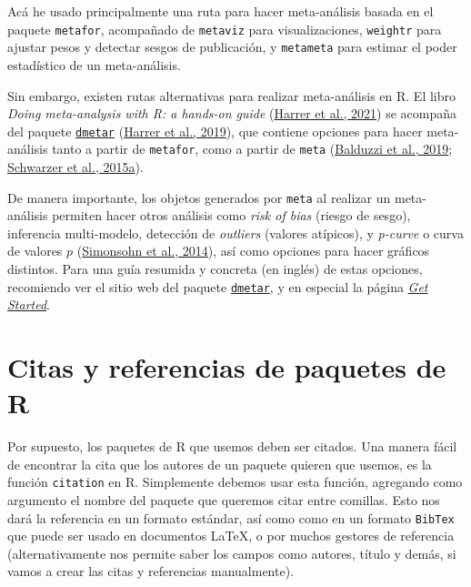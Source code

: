 \documentclass[
  bookmarksnumbered]{article}
\begin{document}
Acá he usado principalmente una ruta para hacer meta-análisis basada en el paquete \texttt{metafor}, acompañado de \texttt{metaviz} para visualizaciones, \texttt{weightr} para ajustar pesos y detectar sesgos de publicación, y \texttt{metameta} para estimar el poder estadístico de un meta-análisis.

Sin embargo, existen rutas alternativas para realizar meta-análisis en R. El libro \emph{Doing meta-analysis with R: a hands-on guide} (\protect\hyperlink{ref-harrer2021doing}{Harrer et al., 2021}) se acompaña del paquete \href{https://dmetar.protectlab.org/index.html}{\texttt{dmetar}} (\protect\hyperlink{ref-Harrer2019dmetar}{Harrer et al., 2019}), que contiene opciones para hacer meta-análisis tanto a partir de \texttt{metafor}, como a partir de \texttt{meta} (\protect\hyperlink{ref-BalduzziMeta2019}{Balduzzi et al., 2019}; \protect\hyperlink{ref-schwarzerMetaAnalysis2015}{Schwarzer et al., 2015a}).

De manera importante, los objetos generados por \texttt{meta} al realizar un meta-análisis permiten hacer otros análisis como \emph{risk of bias} (riesgo de sesgo), inferencia multi-modelo, detección de \emph{outliers} (valores atípicos), y \emph{p-curve} o curva de valores \(p\) (\protect\hyperlink{ref-simonsohnPCurveEffectSize2014}{Simonsohn et al., 2014}), así como opciones para hacer gráficos distintos. Para una guía resumida y concreta (en inglés) de estas opciones, recomiendo ver el sitio web del paquete \href{http://dmetar.protectlab.org/}{\texttt{dmetar}}, y en especial la página \href{https://dmetar.protectlab.org/articles/dmetar.html}{\emph{Get Started}}.

\hypertarget{citas-y-referencias-de-paquetes-de-r}{%
\section{Citas y referencias de paquetes de R}\label{citas-y-referencias-de-paquetes-de-r}}

Por supuesto, los paquetes de R que usemos deben ser citados. Una manera fácil de encontrar la cita que los autores de un paquete quieren que usemos, es la función \texttt{citation} en R. Simplemente debemos usar esta función, agregando como argumento el nombre del paquete que queremos citar entre comillas. Esto nos dará la referencia en un formato estándar, así como como en un formato \texttt{BibTex} que puede ser usado en documentos \LaTeX, o por muchos gestores de referencia (alternativamente nos permite saber los campos como autores, título y demás, si vamos a crear las citas y referencias manualmente).
\end{document}

